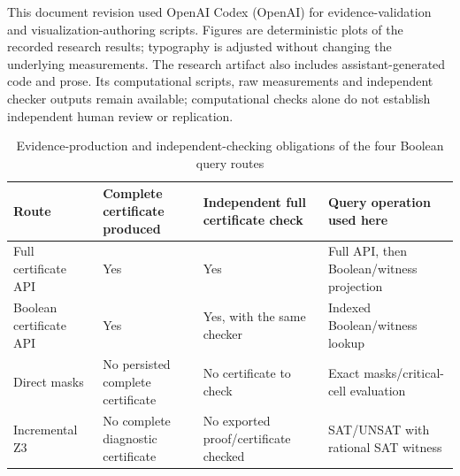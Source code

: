 \documentclass[11pt,a4paper]{article}
\theoremstyle{plain}
\theoremstyle{definition}
\theoremstyle{remark}
\begin{document}
This document revision used OpenAI Codex (OpenAI) for evidence-validation and visualization-authoring scripts. Figures are deterministic plots of the recorded research results; typography is adjusted without changing the underlying measurements. The research artifact also includes assistant-generated code and prose. Its computational scripts, raw measurements and independent checker outputs remain available; computational checks alone do not establish independent human review or replication.

\begin{table}[!htbp]
\caption{Evidence-production and independent-checking obligations of the four Boolean query routes}\label{tab:s12}
\centering
\footnotesize
\setlength{\tabcolsep}{2.5pt}
\renewcommand{\arraystretch}{1.15}
\begin{tabularx}{\textwidth}{@{} >{\raggedright\arraybackslash}p{3cm} >{\centering\arraybackslash}p{2.2cm} >{\centering\arraybackslash}p{2.2cm} >{\raggedright\arraybackslash}X @{}}
\toprule
\textbf{Route} & \textbf{Complete certificate produced} & \textbf{Independent full certificate check} & \textbf{Query operation used here} \\
\midrule
Full certificate API & Yes & Yes & Full API, then Boolean/witness projection \\
Boolean certificate API & Yes & Yes, with the same checker & Indexed Boolean/witness lookup \\
Direct masks & No persisted complete certificate & No certificate to check & Exact masks/critical-cell evaluation \\
Incremental Z3 & No complete diagnostic certificate & No exported proof/\allowbreak certificate checked & SAT/UNSAT with rational SAT witness \\
\bottomrule
\end{tabularx}
\end{table}
\FloatBarrier
\end{document}
